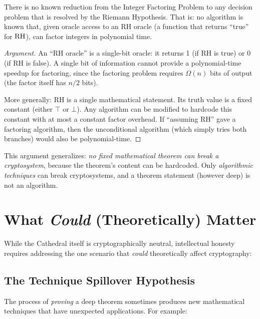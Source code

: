 \documentclass[11pt,a4paper]{article}
\begin{document}
\begin{theorem}
\label{thm:separation}
There is no known reduction from the Integer Factoring Problem to
any decision problem that is resolved by the Riemann Hypothesis.
That is: no algorithm is known that, given oracle access to an
RH oracle (a function that returns ``true'' for $\mathrm{RH}$), can factor
integers in polynomial time.
\end{theorem}

\begin{proof}[Argument]
An ``RH oracle'' is a single-bit oracle: it returns 1 (if RH is
true) or 0 (if RH is false). A single bit of information cannot
provide a polynomial-time speedup for factoring, since the factoring
problem requires $\Omega(n)$ bits of output (the factor itself has
$n/2$ bits).

More generally: RH is a single mathematical statement. Its truth
value is a fixed constant (either $\top$ or $\bot$). Any algorithm
can be modified to hardcode this constant with at most a constant
factor overhead. If ``assuming RH'' gave a factoring algorithm, then
the unconditional algorithm (which simply tries both branches)
would also be polynomial-time.
\end{proof}

\begin{remark}
This argument generalizes: \emph{no fixed mathematical theorem can
break a cryptosystem}, because the theorem's content can be
hardcoded. Only \emph{algorithmic techniques} can break
cryptosystems, and a theorem statement (however deep) is not an
algorithm.
\end{remark}

\section{What \emph{Could} (Theoretically) Matter}
\label{sec:could}

While the Cathedral itself is cryptographically neutral, intellectual
honesty requires addressing the one scenario that \emph{could}
theoretically affect cryptography:

\subsection{The Technique Spillover Hypothesis}

The process of \emph{proving} a deep theorem sometimes produces new
mathematical techniques that have unexpected applications. For example:
\end{document}
